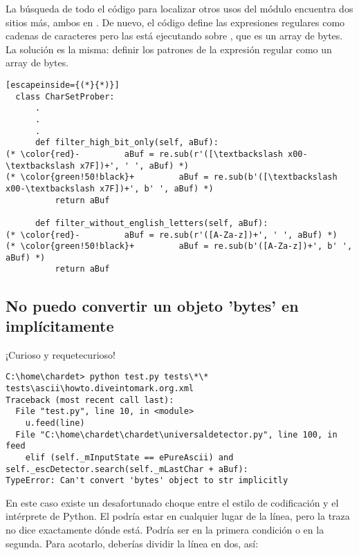 La búsqueda de todo el código para localizar otros usos del módulo  encuentra dos sitios más, ambos en . De nuevo, el código define las expresiones regulares como cadenas de caracteres pero las está ejecutando sobre , que es un array de bytes. La solución es la misma: definir los patrones de la expresión regular como un array de bytes.


\begin{lstlisting}[escapeinside={(*}{*)}]
  class CharSetProber:
      .
      .
      .
      def filter_high_bit_only(self, aBuf):
(* \color{red}-         aBuf = re.sub(r'([\textbackslash x00-\textbackslash x7F])+', ' ', aBuf) *)
(* \color{green!50!black}+         aBuf = re.sub(b'([\textbackslash x00-\textbackslash x7F])+', b' ', aBuf) *)
          return aBuf
    
      def filter_without_english_letters(self, aBuf):
(* \color{red}-         aBuf = re.sub(r'([A-Za-z])+', ' ', aBuf) *)
(* \color{green!50!black}+         aBuf = re.sub(b'([A-Za-z])+', b' ', aBuf) *)
          return aBuf
\end{lstlisting}

\subsection{No puedo convertir un objeto 'bytes' en  implícitamente}

¡Curioso y requetecurioso!


\noindent\begin{minipage}{\textwidth}
\begin{lstlisting}[breaklines=true]
C:\home\chardet> python test.py tests\*\*
tests\ascii\howto.diveintomark.org.xml
Traceback (most recent call last):
  File "test.py", line 10, in <module>
    u.feed(line)
  File "C:\home\chardet\chardet\universaldetector.py", line 100, in feed
    elif (self._mInputState == ePureAscii) and self._escDetector.search(self._mLastChar + aBuf):
TypeError: Can't convert 'bytes' object to str implicitly
\end{lstlisting}
\end{minipage}

En este caso existe un desafortunado choque entre el estilo de codificación y el intérprete de Python. El  podría estar en cualquier lugar de la línea, pero la traza no dice exactamente dónde está. Podría ser en la primera condición o en la segunda. Para acotarlo, deberías dividir la línea en dos, así:


